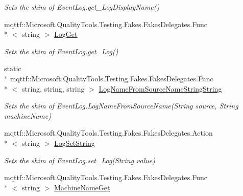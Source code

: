 \begin{DoxyCompactItemize}
\begin{DoxyCompactList}\small\item\em Sets the shim of Event\-Log.\-get\-\_\-\-Log\-Display\-Name()\end{DoxyCompactList}\item 
mqttf\-::\-Microsoft.\-Quality\-Tools.\-Testing.\-Fakes.\-Fakes\-Delegates.\-Func\\*
$<$ string $>$ \hyperlink{class_system_1_1_diagnostics_1_1_fakes_1_1_shim_event_log_a34be34850bf50e1468eaf03be460cb06}{Log\-Get}
\begin{DoxyCompactList}\small\item\em Sets the shim of Event\-Log.\-get\-\_\-\-Log()\end{DoxyCompactList}\item 
static \\*
mqttf\-::\-Microsoft.\-Quality\-Tools.\-Testing.\-Fakes.\-Fakes\-Delegates.\-Func\\*
$<$ string, string, string $>$ \hyperlink{class_system_1_1_diagnostics_1_1_fakes_1_1_shim_event_log_a5047af2fd0643fda61e2cc93a2b58b8a}{Log\-Name\-From\-Source\-Name\-String\-String}
\begin{DoxyCompactList}\small\item\em Sets the shim of Event\-Log.\-Log\-Name\-From\-Source\-Name(\-String source, String machine\-Name)\end{DoxyCompactList}\item 
mqttf\-::\-Microsoft.\-Quality\-Tools.\-Testing.\-Fakes.\-Fakes\-Delegates.\-Action\\*
$<$ string $>$ \hyperlink{class_system_1_1_diagnostics_1_1_fakes_1_1_shim_event_log_acc996d27a6b101e2035e357da1266cc0}{Log\-Set\-String}
\begin{DoxyCompactList}\small\item\em Sets the shim of Event\-Log.\-set\-\_\-\-Log(\-String value)\end{DoxyCompactList}\item 
mqttf\-::\-Microsoft.\-Quality\-Tools.\-Testing.\-Fakes.\-Fakes\-Delegates.\-Func\\*
$<$ string $>$ \hyperlink{class_system_1_1_diagnostics_1_1_fakes_1_1_shim_event_log_a7d7e0b2291a4fb819d46bfd374757897}{Machine\-Name\-Get}

\end{DoxyCompactItemize}
